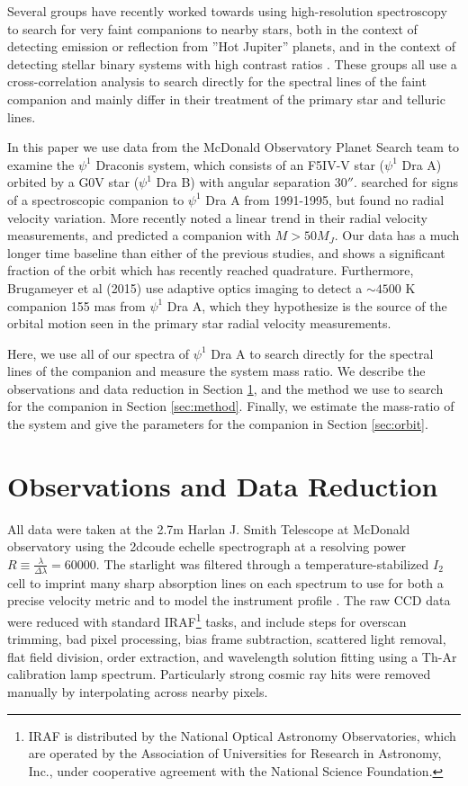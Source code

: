 \documentclass[twocolumn]{emulateapj}
\begin{document}
Several groups have recently worked towards using high-resolution spectroscopy to search for very faint companions to nearby stars, both in the context of detecting emission \citep{Snellen2010, Gullikson2013} or reflection \citep{Martins2013} from ''Hot Jupiter'' planets, and in the context of detecting stellar binary systems with high contrast ratios \citep[e.g.][]{Gullikson2013_2, Kolbl2015}. These groups all use a cross-correlation analysis to search directly for the spectral lines of the faint companion and mainly differ in their treatment of the primary star and telluric lines.

In this paper we use data from the McDonald Observatory Planet Search team to examine the $\psi^1$ Draconis system, which consists of an F5IV-V star ($\psi^1$ Dra A) orbited by a G0V star ($\psi^1$ Dra B) with angular separation $30''$\citep{WDS}. \cite{Tokovinin2002} searched for signs of a spectroscopic companion to $\psi^1$ Dra A from 1991-1995, but found no radial velocity variation. More recently \cite{Toyota2009} noted a linear trend in their radial velocity measurements, and predicted a companion with $M > 50 M_J$. Our data has a much longer time baseline than either of the previous studies, and shows a significant fraction of the orbit which has recently reached quadrature. Furthermore, Brugameyer et al (2015) use adaptive optics imaging to detect a $\sim 4500$ K companion 155 mas from $\psi^1$ Dra A, which they hypothesize is the source of the orbital motion seen in the primary star radial velocity measurements. 

Here, we use all of our spectra of $\psi^1$ Dra A to search directly for the spectral lines of the companion and measure the system mass ratio. We describe the observations and data reduction in Section \ref{sec:obs}, and the method we use to search for the companion in Section \ref{sec:method}. Finally, we estimate the mass-ratio of the system and give the parameters for the companion in Section \ref{sec:orbit}.


\section{Observations and Data Reduction}
\label{sec:obs}
All data were taken at the 2.7m Harlan J. Smith Telescope at McDonald observatory using the 2dcoude echelle spectrograph \citep{TS23} at a resolving power $R\equiv \frac{\lambda}{\Delta \lambda} = 60000$. The starlight was filtered through a temperature-stabilized $I_2$ cell to imprint many sharp absorption lines on each spectrum to use for both a precise velocity metric \citep{Butler1996} and to model the instrument profile \citep{Endl2000}. The raw CCD data were reduced with standard IRAF\footnote{IRAF is distributed by the National Optical Astronomy Observatories, which are operated by the Association of Universities for Research in Astronomy, Inc., under cooperative agreement with the National Science Foundation.} tasks, and include steps for overscan trimming, bad pixel processing, bias frame subtraction, scattered light removal, flat field division, order extraction, and wavelength solution fitting using a Th-Ar calibration lamp spectrum. Particularly strong cosmic ray hits were removed manually by interpolating across nearby pixels.
\end{document}
